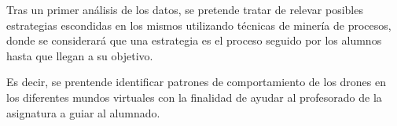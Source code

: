 Tras un primer análisis de los datos, se pretende tratar de relevar posibles estrategias escondidas en los mismos utilizando técnicas de minería de procesos, donde se considerará que una estrategia es el proceso seguido por los alumnos hasta que llegan a su objetivo.

Es decir, se prentende identificar patrones de comportamiento de los drones en los diferentes mundos virtuales con la finalidad de ayudar al profesorado de la asignatura a guiar al alumnado.